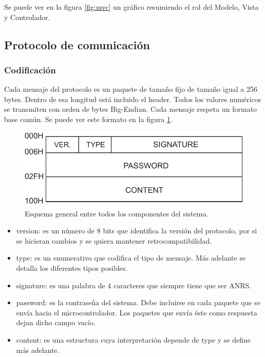 Se puede ver en la figura \ref{fig:mvc} un gráfico resumiendo el rol del Modelo, Vista y Controlador.


\FloatBarrier
\subsection{Protocolo de comunicación} \label{sec:protocolo}

\subsubsection{Codificación}

Cada mensaje del protocolo es un paquete de tamaño fijo de tamaño igual a 256 bytes.
Dentro de esa longitud está incluido el header.
Todos los valores numéricos se transmiten con orden de bytes Big-Endian.
Cada mensaje respeta un formato base común. Se puede ver este formato en la figura \ref{fig:paquete-base}.


\begin{figure}[!ht]
	\centering
	\includegraphics[width=0.6\linewidth]{imagenes/protocolo/paquete-base.pdf}
	\caption{Esquema general entre todos los componentes del sistema.}
	\label{fig:paquete-base}
\end{figure}

\begin{itemize}
	\item version: es un número de 8 bits que identifica la versión del protocolo, por si se hicieran cambios y se quiera mantener retrocompatibilidad.
	\item type: es un enumerativo que codifica el tipo de mensaje. Más adelante se detalla los diferentes tipos posibles.
	\item signature: es una palabra de 4 caracteres que siempre tiene que ser ANRS.
	\item password: es la contraseña del sistema. Debe incluirse en cada paquete que se envía hacia el microcontrolador. Los paquetes que envía éste como respuesta dejan dicho campo vacío.
	\item content: es una estructura cuya interpretación depende de type y se define más adelante.
\end{itemize}



